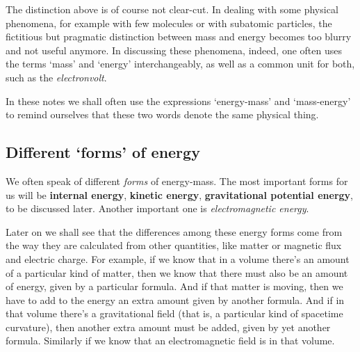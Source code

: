 \documentclass[a4paper,12pt,%
onecolumn,oneside,%
british%
]{memoir}
\providecommand{\href}[2]{#2}
\renewcommand*{\|}[1][]{\nonscript\:#1\vert\nonscript\:\mathopen{}}
\newcommand*{\furl}[2]{\href{#1}{#2}\pagenote{\url{#1}}}
\newcommand*{\energym}{energy-mass}
\newcommand*{\masse}{mass-energy}
\begin{document}
\smallskip

The distinction above is of course not clear-cut. In dealing with some physical phenomena, for example with few molecules or with subatomic particles, the fictitious but pragmatic distinction between mass and energy becomes too blurry and not useful anymore. In discussing these phenomena, indeed, one often uses the terms \enquote*{mass} and \enquote*{energy} interchangeably, as well as a common unit for both, such as the \furl{https://home.cern/tags/13-tev}{\emph{electronvolt}}.

\medskip

In these notes we shall often use the expressions \enquote*{\energym} and \enquote*{\masse} to remind ourselves that these two words denote the same physical thing.

\subsection{Different \enquote*{forms} of energy}
\label{sec:forms_energy}

We often speak of different \emph{forms} of \energym. The most important forms for us will be \textbf{internal energy}, \textbf{kinetic energy}, \textbf{gravitational potential energy}, to be discussed later. Another important one is \emph{electromagnetic energy}.

Later on we shall see that the differences among these energy forms come from the way they are calculated from other quantities, like matter or magnetic flux and electric charge. For example, if we know that in a volume there's an amount of a particular kind of matter, then we know that there must also be an amount of energy, given by a particular formula. And if that matter is moving, then we have to add to the energy an extra amount given by another formula. And if in that volume there's a gravitational field (that is, a particular kind of spacetime curvature), then another extra amount must be added, given by yet another formula. Similarly if we know that an electromagnetic field is in that volume.
\end{document}
